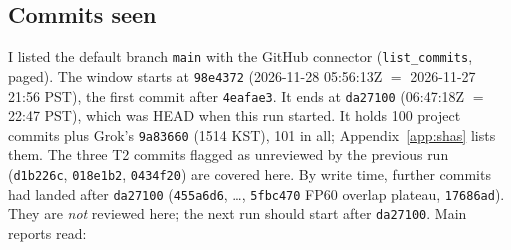\documentclass[11pt]{article}
\theoremstyle{definition}
\theoremstyle{remark}
\begin{document}
\subsection{Commits seen}
I listed the default branch \texttt{main} with the GitHub connector (\texttt{list\_commits},
paged). The window starts at \texttt{98e4372} (2026-11-28 05:56:13Z $=$ 2026-11-27 21:56
PST), the first commit after \texttt{4eafae3}. It ends at \texttt{da27100} (06:47:18Z $=$
22:47 PST), which was HEAD when this run started. It holds 100 project commits plus Grok's
\texttt{9a83660} (1514 KST), 101 in all; Appendix~\ref{app:shas} lists them. The three T2
commits flagged as unreviewed by the previous run (\texttt{d1b226c}, \texttt{018e1b2},
\texttt{0434f20}) are covered here. By write time, further commits had landed after
\texttt{da27100} (\texttt{455a6d6}, \ldots, \texttt{5fbc470} FP60 overlap plateau,
\texttt{17686ad}). They are \emph{not} reviewed here; the next run should start after
\texttt{da27100}. Main reports read:
\end{document}
